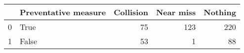 \begin{tabular}{llrrr}
\toprule
{} &  Preventative measure &  Collision &  Near miss &  Nothing \\
\midrule
0 &                  True &         75 &        123 &      220 \\
1 &                 False &         53 &          1 &       88 \\
\bottomrule
\end{tabular}
